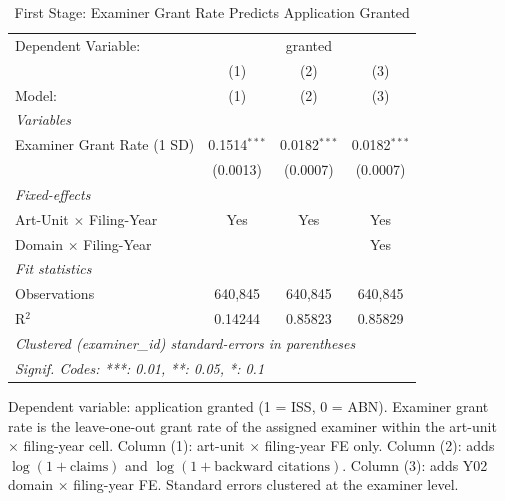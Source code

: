 
\begin{table}[htbp]
   \caption{\label{tab:firststage} First Stage: Examiner Grant Rate Predicts Application Granted}
   \centering
   \begin{tabular}{lccc}
      \tabularnewline \midrule \midrule
      Dependent Variable: & \multicolumn{3}{c}{granted}\\
                                     & (1)            & (2)            & (3) \\   
      Model:                         & (1)            & (2)            & (3)\\  
      \midrule
      \emph{Variables}\\
      Examiner Grant Rate (1 SD)     & 0.1514$^{***}$ & 0.0182$^{***}$ & 0.0182$^{***}$\\   
                                     & (0.0013)       & (0.0007)       & (0.0007)\\   
      \midrule
      \emph{Fixed-effects}\\
      Art-Unit $\times$ Filing-Year  & Yes            & Yes            & Yes\\  
      Domain $\times$ Filing-Year    &                &                & Yes\\  
      \midrule
      \emph{Fit statistics}\\
      Observations                   & 640,845        & 640,845        & 640,845\\  
      R$^2$                          & 0.14244        & 0.85823        & 0.85829\\  
      \midrule \midrule
      \multicolumn{4}{l}{\emph{Clustered (examiner\_id) standard-errors in parentheses}}\\
      \multicolumn{4}{l}{\emph{Signif. Codes: ***: 0.01, **: 0.05, *: 0.1}}\\
   \end{tabular}
   
   \par \raggedright 
   Dependent variable: application granted (1 = ISS, 0 = ABN). Examiner grant rate is the leave-one-out grant rate of the assigned examiner within the art-unit $\times$ filing-year cell. Column (1): art-unit $\times$ filing-year FE only. Column (2): adds $\log(1 + \text{claims})$ and $\log(1 + \text{backward citations})$. Column (3): adds Y02 domain $\times$ filing-year FE. Standard errors clustered at the examiner level.
\end{table}



